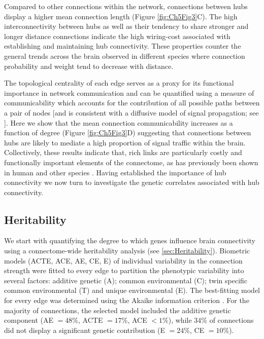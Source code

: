 Compared to other connections within the network, connections between hubs display a higher mean connection length (Figure \ref{fig:Ch5Fig3}C). The high interconnectivity between hubs as well as their tendency to share stronger and longer distance connections indicate the high wiring-cost associated with establishing and maintaining hub connectivity. These properties counter the general trends across the brain observed in different species where connection probability \citep{Arnatkeviciute2018,Fornito2019,Fulcher2016} and weight \citep{Betzel2018} tend to decrease with distance.

The topological centrality of each edge serves as a proxy for its functional importance in network communication and can be quantified using a measure of communicability which accounts for the contribution of all possible paths between a pair of nodes [and is consistent with a diffusive model of signal propagation; see \citep{Avena-Koenigsberger2017}]. Here we show that the mean connection communicability increases as a function of degree (Figure \ref{fig:Ch5Fig3}D) suggesting that connections between hubs are likely to mediate a high proportion of signal traffic within the brain. Collectively, these results indicate that, rich links are particularly costly and functionally important elements of the connectome, as has previously been shown in human \citep{VandenHeuvel2011} and other species \citep{Arnatkeviciute2018,Fulcher2016,Towlson2013}. Having established the importance of hub connectivity we now turn to investigate the genetic correlates associated with hub connectivity.

\subsection{Heritability}

We start with quantifying the degree to which genes influence brain connectivity using a connectome-wide heritability analysis (see \ref{sec:Heritability}). Biometric models (ACTE, ACE, AE, CE, E) of individual variability in the connection strength were fitted to every edge to partition the phenotypic variability into several factors: additive genetic (A); common environmental (C); twin specific common environmental (T) and unique environmental (E). The best-fitting model for every edge was determined using the Akaike information criterion \citep{Akaike1998}. For the majority of connections, the selected model included the additive genetic component (AE $= 48\%$, ACTE $= 17\%$, ACE $<1\%$), while $34\%$ of connections did not display a significant genetic contribution (E $= 24\%$, CE $= 10\%$).

